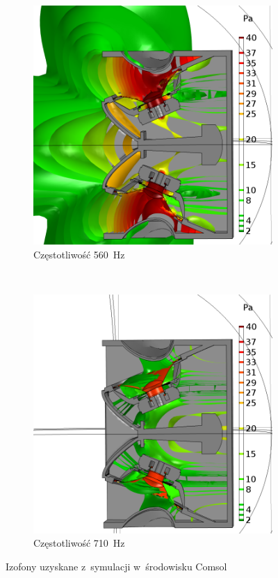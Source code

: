 \documentclass[12pt]{oska}
\begin{document}
		\begin{figure}
			\centering
			\begin{subfigure}[b]{.49\textwidth}
				\includegraphics[width=\textwidth]{absp_560Hz.png}
				\caption{Częstotliwość \SI{560}{\hertz}}
				\label{r:C_560iz}
			\end{subfigure}
			~
			\begin{subfigure}[b]{.49\textwidth}
			\includegraphics[width=\textwidth]{absp_710Hz.png}
				\caption{Częstotliwość \SI{710}{\hertz}}
				\label{r:C_710iz}
			\end{subfigure}
			
			\caption{Izofony uzyskane z~symulacji w~środowisku Comsol}
			\label{r:Comsol}
		\end{figure}
		
\end{document}
